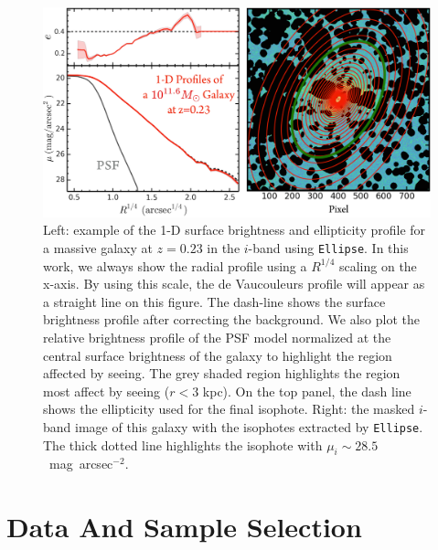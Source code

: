 \documentclass{emulateapj}
\def\sb{mag~arcsec$^{-2}$}
\begin{document}
\begin{CJK*}{UTF8}{gbsn}
    \begin{figure}[bt]
        \centering 
        \includegraphics[width=\textwidth]{fig/redbcg_ellipse_example}
        \caption{
            Left: example of the 1-D surface brightness and ellipticity profile 
            for a massive galaxy at $z=0.23$ in the $i$-band using \texttt{Ellipse}. 
            In this work, we always show the radial profile using a $R^{1/4}$ scaling 
            on the x-axis. 
            By using this scale, the de Vaucouleurs profile will appear as a straight 
            line on this figure. 
            The dash-line shows the surface brightness profile after correcting the 
            background. 
            We also plot the relative brightness profile of the PSF model normalized 
            at the central surface brightness of the galaxy to highlight the region 
            affected by seeing. 
            The grey shaded region highlights the region most affect by seeing 
            ($r<3$ kpc).
            On the top panel, the dash line shows the ellipticity used for the final 
            isophote. 
            Right: the masked $i$-band image of this galaxy with the isophotes 
            extracted by \texttt{Ellipse}. 
            The thick dotted line highlights the isophote with 
            $\mu_{i}\sim 28.5$~\sb.
            }
        \label{fig:ellipse}
    \end{figure}

\section{Data And Sample Selection}
    \label{sec:data}


\end{CJK*}
\end{document}
